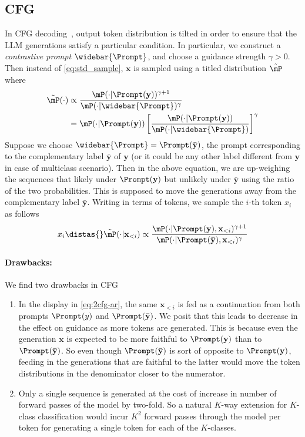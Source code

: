 \subsection{CFG}
In CFG decoding~\cite{sanchez2023stay}, output token distribution is tilted in order to ensure that the LLM generations satisfy a particular condition.  In particular, we construct a \textit{contrastive prompt} $\widebar{\Prompt}$, and choose a guidance strength $\gamma>0$. Then instead of \eqref{eq:std_sample}, $\mathbf{x}$ is sampled using a titled distribution $\tilde \mP$ where
\begin{align}
    \tilde \mP(\cdot)& \propto  \frac{\mP(\cdot|\Prompt(\mathbf{y}))^{\gamma+1}}{\mP(\cdot|\widebar{\Prompt})^{\gamma}}\nonumber \\
    &=\mP(\cdot|\Prompt(\mathbf{y}))\left[\frac{\mP(\cdot|\Prompt(\mathbf{y}))}{\mP(\cdot|\widebar{\Prompt})}\right]^\gamma\label{eq:2cfg_seq}
\end{align}
Suppose we choose $\widebar{\Prompt}=\Prompt(\bar{\mathbf{y}})$, the prompt corresponding to the complementary label $\bar{\mathbf{y}}$ of $\mathbf{y}$ (or it could be any other label different from $\mathbf{y}$ in case of multiclass scenario). Then in the above equation, we are up-weighing the sequences that likely under $\Prompt(\mathbf{y})$ but unlikely under $\bar{\mathbf{y}}$ using the ratio of the two probabilities. This is supposed to move the generations away from the complementary label $\bar{\mathbf{y}}$. Writing in terms of tokens, we sample the $i$-th token $x_i$ as follows
\begin{equation}
    \label{eq:2cfg-ar}
    x_i\distas{}\tilde \mP(\cdot|\mathbf{x}_{<i}) \propto \frac{\mP(\cdot|\Prompt(\mathbf{y}),\mathbf{x}_{<i})^{\gamma+1}}{\mP(\cdot|\Prompt(\mathbf{\bar{\mathbf{y}}}),\mathbf{x}_{<i})^{\gamma}}
\end{equation}

\paragraph{Drawbacks:} We find two drawbacks in CFG
\begin{enumerate}
    \item In the display in \eqref{eq:2cfg-ar}, the same $\mathbf{x}_{<i}$ is fed as a continuation from both prompts $\Prompt(y)$ and $\Prompt(\mathbf{\bar{\mathbf{y}}})$. We posit that this leads to decrease in the effect on guidance as more tokens are generated. This is because even the generation $\mathbf{x}$ is expected to be more faithful to $\Prompt(\mathbf{y})$ than to $\Prompt(\mathbf{\bar{\mathbf{y}}})$. So even though $\Prompt(\mathbf{\bar{\mathbf{y}}})$ is sort of opposite to $\Prompt(\mathbf{y})$, feeding in the generations that are faithful to the latter would move the token distributions in the denominator closer to the numerator.
    \item Only a single sequence is generated at the cost of increase in number of forward passes of the model by two-fold. So a natural $K$-way extension for $K$-class classification would incur $K^2$ forward passes through the model per token for generating a single token for each of the $K$-classes. 
\end{enumerate}

